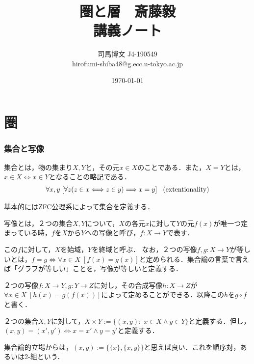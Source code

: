 \documentclass[uplatex, 12pt, a4paper, dvipdfmx]{jsarticle}
\title{圏と層　斎藤毅\\講義ノート}
\author{司馬博文 J4-190549\\hirofumi-shiba48@g.ecc.u-tokyo.ac.jp}
\date{\today}
\begin{document}
\maketitle

\part{圏}
\section{集合と写像}
\begin{shadebox}\begin{definition}[集合]集合とは，物の集まり$X,Y$と，その元$x\in X$のことである．また，$X=Y$とは，$x\in X \Longleftrightarrow x \in Y$となることの略記である．$$\forall x,y \; [ \forall z (z\in x \Longleftrightarrow z\in y) \Longrightarrow x=y ] \hspace{3mm}\mathrm{(extentionality)}$$ \end{definition}\end{shadebox}
基本的にはZFC公理系によって集合を定義する．
\begin{shadebox}\begin{definition}[写像]写像とは，２つの集合$X,Y$について，$X$の各元$x$に対して$Y$の元$f(x)$が唯一つ定まっている時，$f$を$X$から$Y$への写像と呼び，$f:X\longrightarrow Y$で表す．\end{definition}\end{shadebox}
この$f$に対して，$X$を始域，$Y$を終域と呼ぶ．
なお，２つの写像$f,g:X\longrightarrow Y$が等しいとは，$f=g\Longleftrightarrow \forall x \in X \; [f(x)=g(x)]$と定められる．集合論の言葉で言えば「グラフが等しい」ことを，写像が等しいと定義する．
\begin{shadebox}\begin{definition}[写像の合成]２つの写像$f:X\longrightarrow Y, g:Y\longrightarrow Z$に対し，その合成写像$h:X\longrightarrow Z$が$\forall x \in X \; [h(x)=g(f(x))]$によって定めることができる．以降この$h$を$g\circ f$と書く．\end{definition}\end{shadebox}
\begin{shadebox}\begin{definition}[集合の積]２つの集合$X,Y$に対して，$X\times Y:=\{ (x,y) :\; x\in X \wedge y\in Y\}$と定義する．但し，$(x,y)=(x',y')\Longleftrightarrow x=x'\wedge y=y'$と定義する． \end{definition}\end{shadebox}
集合論的立場からは，$(x,y):=\{\{x\},\{x,y\}\}$と思えば良い．これを順序対，あるいは2-組という．
\end{document}
